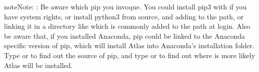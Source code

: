 \documentclass[letterpaper,10pt,english]{sphinxmanual}
\begin{document}
\begin{enumerate}
\begin{sphinxadmonition}{note}{Note:}
:
Be aware which pip you invoque. You could install pip3 with
 if you have system rights, or
install python3 from source, and adding  to the
path, or linking it in a directory like  which is commonly
added to the path at login. Also be aware that, if you installed
Anaconda, pip could be linked to the Anaconda specific version of pip, which
will install Atlas into Anaconda’s installation folder.
Type  or  to find out the source of pip, and type
 or  to find out where is more likely
Atlas will be installed.
\end{sphinxadmonition}

\end{enumerate}
\end{document}
